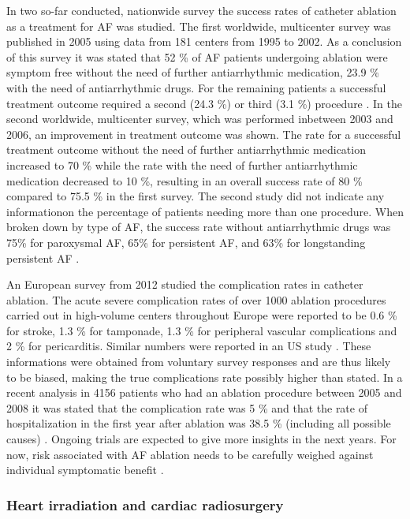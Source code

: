 \documentclass[type=dr, dr=rernat, accentcolor=tud7b,colorbacktitle, bigchapter, openright, twoside, 12pt ]{tudthesis}
\begin{document}
In two so-far conducted, nationwide survey the success rates of catheter ablation as a treatment 
for AF was studied. The first worldwide, multicenter survey was published in 2005 using data from 181 centers from 1995 to 2002. As a 
conclusion of this survey it was stated that 52 \% of AF patients undergoing ablation were symptom free without the need of further 
antiarrhythmic medication, 23.9 \% with the need of antiarrhythmic drugs. For the remaining patients a successful treatment outcome 
required a second (24.3 \%) or third (3.1 \%) procedure \cite{Cap05}. In the second worldwide, multicenter survey, which was performed 
inbetween 2003 and 2006, an improvement in treatment outcome was shown. The rate for a successful treatment outcome without the need of 
further antiarrhythmic medication increased to 70 \% while the rate with the need of further antiarrhythmic medication decreased to 10 \%, 
resulting in an overall success rate of 80 \% compared to 75.5 \% in the first survey. The second study did not indicate any informationon 
the percentage of patients needing more than one procedure. When broken down 
by type of AF, the success rate without antiarrhythmic drugs was 75\% for paroxysmal AF, 65\% for persistent AF, and 63\% for longstanding 
persistent AF \cite{Cap10} \cite{Sto}.\newline

An European survey from 2012 \cite{Arb12} studied the complication rates in catheter ablation. The acute severe complication rates of over 
1000 ablation procedures carried out in high-volume centers throughout Europe were reported to be 0.6 \% for stroke, 1.3 \% for tamponade, 
1.3 \% for peripheral vascular complications and 2 \% for pericarditis. Similar numbers were reported in an US study \cite{Hoy11} 
\cite{Cap10}. These informations were obtained from voluntary survey responses and are thus likely to be biased, making the true 
complications rate possibly higher than stated. In a recent analysis in 4156 patients who had an ablation procedure between 2005 and 2008 
it was stated that the complication rate was 5 \% and that the rate of hospitalization in the first year after ablation was 38.5 \% 
(including all possible causes) \cite{Sha12}. Ongoing trials are expected to give more insights in the next years. For now, risk 
associated with AF ablation needs to be carefully weighed against individual 
symptomatic benefit \cite{ESC12}. 


\subsubsection*{Heart irradiation and cardiac radiosurgery}
\label{cardiacradiosurgery}
\end{document}
